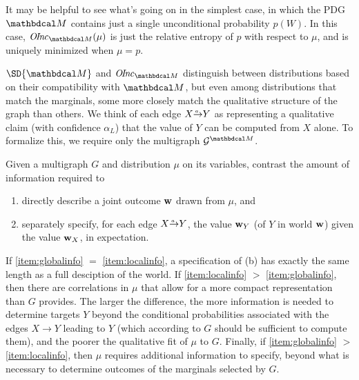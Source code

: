 {	%
    It may be helpful to see what's going on in the simplest case, 
    in which the PDG $\dg M$ contains just a single unconditional probability $p(W)$.
    In this case, $\OInc_{\dg M}(\mu)$ is just the relative entropy of $p$ with respect to $\mu$, and is uniquely minimized when $\mu = p$. 
}

$\SD{\dg M}$ and $\OInc_{\dg M}$ distinguish %
between distributions based on their compatibility with
$\dg M$, but even among distributions that match the
marginals, some more closely match the qualitative structure
of the graph than others.  
We think of each edge $\ed aXY$ as representing a
qualitative claim
(with confidence $\alpha_L$)
that the value of $Y$ can be computed from
$X$ alone.  
To formalize this, we require only the 
multigraph
$\Gr^{\dg M}$.

Given a multigraph $G$ and distribution $\mu$ on its variables,
contrast the amount of
information required to 
\begin{enumerate}[label=(\alph*)]
\item directly describe a joint outcome  \label{item:globalinfo}
$\mathbf w$ drawn from $\mu$, and 
\item separately specify, for each edge $\ed aXY$, the value
    $\mathbf w_Y$ (of $Y$ in world $\mathbf w$) 
	given the value $\mathbf w_X$, in expectation.
	\label{item:localinfo}
\end{enumerate}
If \ref{item:globalinfo} $=$ \ref{item:localinfo},
a specification of (b) has
 exactly the same length as a full desciption of the world. 
If \ref{item:localinfo} $>$ \ref{item:globalinfo}, then there are
correlations in $\mu$ that allow for a more compact representation
than $G$ provides. 
The larger the difference,  the more information is needed to determine
targets $Y$ beyond the conditional probabilities associated with the
edges $X \rightarrow Y$ leading to $Y$
(which according to $G$ should be sufficient to compute them), 
and the poorer the qualitative fit of $\mu$ to $G$.
Finally,
if \ref{item:globalinfo} $>$ \ref{item:localinfo}, then 
$\mu$ requires
additional information to specify, beyond
what is necessary to determine outcomes of the marginals selected by $G$.

